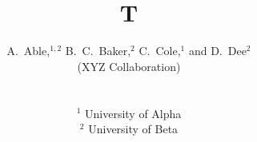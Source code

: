 \documentclass{mnras}

\title{T}
\author{
\parbox{\textwidth}{
\Large
A.~Able,$^{1,2}$
B.~C.~Baker,$^{2}$
C.~Cole,$^{1}$
and D.~Dee$^{2}$
\begin{center} (XYZ Collaboration) \end{center}
}
\vspace{0.4cm}
\\
\parbox{\textwidth}{
$^{1}$ University of Alpha\\
$^{2}$ University of Beta
}}
\maketitle

